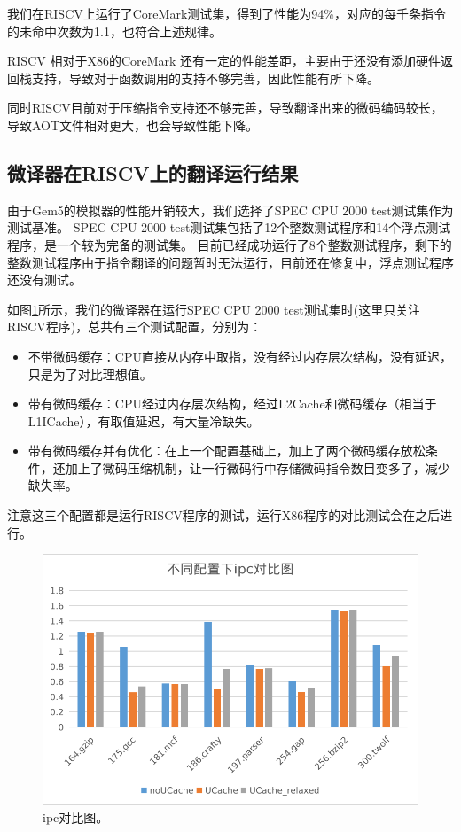我们在RISCV上运行了CoreMark测试集，得到了性能为94\%，对应的每千条指令的未命中次数为1.1，也符合上述规律。

RISCV 相对于X86的CoreMark 还有一定的性能差距，主要由于还没有添加硬件返回栈支持，导致对于函数调用的支持不够完善，因此性能有所下降。

同时RISCV目前对于压缩指令支持还不够完善，导致翻译出来的微码编码较长，导致AOT文件相对更大，也会导致性能下降。


\subsection{微译器在RISCV上的翻译运行结果}
由于Gem5的模拟器的性能开销较大，我们选择了SPEC CPU 2000 test测试集作为测试基准。
SPEC CPU 2000 test测试集包括了12个整数测试程序和14个浮点测试程序，是一个较为完备的测试集。
目前已经成功运行了8个整数测试程序，剩下的整数测试程序由于指令翻译的问题暂时无法运行，目前还在修复中，浮点测试程序还没有测试。

如图\ref{img:ipc}所示，我们的微译器在运行SPEC CPU 2000 test测试集时(这里只关注RISCV程序)，总共有三个测试配置，分别为：
\begin{itemize}
  \item 不带微码缓存：CPU直接从内存中取指，没有经过内存层次结构，没有延迟，只是为了对比理想值。
  \item 带有微码缓存：CPU经过内存层次结构，经过L2Cache和微码缓存（相当于L1ICache），有取值延迟，有大量冷缺失。
  \item 带有微码缓存并有优化：在上一个配置基础上，加上了两个微码缓存放松条件，还加上了微码压缩机制，让一行微码行中存储微码指令数目变多了，减少缺失率。
\end{itemize}
注意这三个配置都是运行RISCV程序的测试，运行X86程序的对比测试会在之后进行。

\begin{figure}[h]
  \centering
  \includegraphics[width=0.8\linewidth]{./plot/ipc.png}
  \caption{ipc对比图。}
  \label{img:ipc}
\end{figure}

